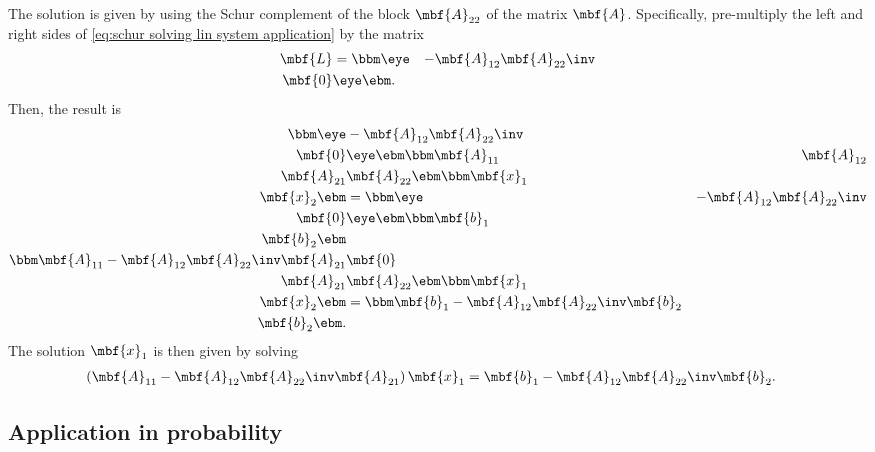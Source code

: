 The solution is given by using the Schur complement of the block $\mbf{A}_{22}$ of the matrix $\mbf{A}$. Specifically, pre-multiply the left and right sides of \eqref{eq:schur solving lin system application} by the matrix
\begin{align}
    \mbf{L} &= 
    \bbm
        \eye & -\mbf{A}_{12}\mbf{A}_{22}\inv\\
        \mbf{0} & \eye
    \ebm.    
\end{align}
Then, the result is
\begin{align}
    \bbm
        \eye & -\mbf{A}_{12}\mbf{A}_{22}\inv\\
        \mbf{0} & \eye
    \ebm
    \bbm
    \mbf{A}_{11} & \mbf{A}_{12}\\
    \mbf{A}_{21} & \mbf{A}_{22}
    \ebm
    \bbm \mbf{x}_{1}\\\mbf{x}_{2} \ebm 
    &=
    \bbm
        \eye & -\mbf{A}_{12}\mbf{A}_{22}\inv\\
        \mbf{0} & \eye
    \ebm
    \bbm \mbf{b}_{1} \\\mbf{b}_{2} \ebm\\
    \bbm
        \mbf{A}_{11}-\mbf{A}_{12}\mbf{A}_{22}\inv\mbf{A}_{21} & \mbf{0}\\
        \mbf{A}_{21} & \mbf{A}_{22}
    \ebm
    \bbm
        \mbf{x}_{1}\\\mbf{x}_{2}
    \ebm
    &=
    \bbm
        \mbf{b}_{1} - \mbf{A}_{12}\mbf{A}_{22}\inv\mbf{b}_{2}\\
        \mbf{b}_{2}
    \ebm.
\end{align}
The solution $\mbf{x}_{1}$ is then given by solving
\begin{align}
    \left( \mbf{A}_{11}-\mbf{A}_{12}\mbf{A}_{22}\inv\mbf{A}_{21} \right)\mbf{x}_{1} 
    &=
    \mbf{b}_{1} - \mbf{A}_{12}\mbf{A}_{22}\inv\mbf{b}_{2}.
\end{align}


\subsection{Application in probability}
